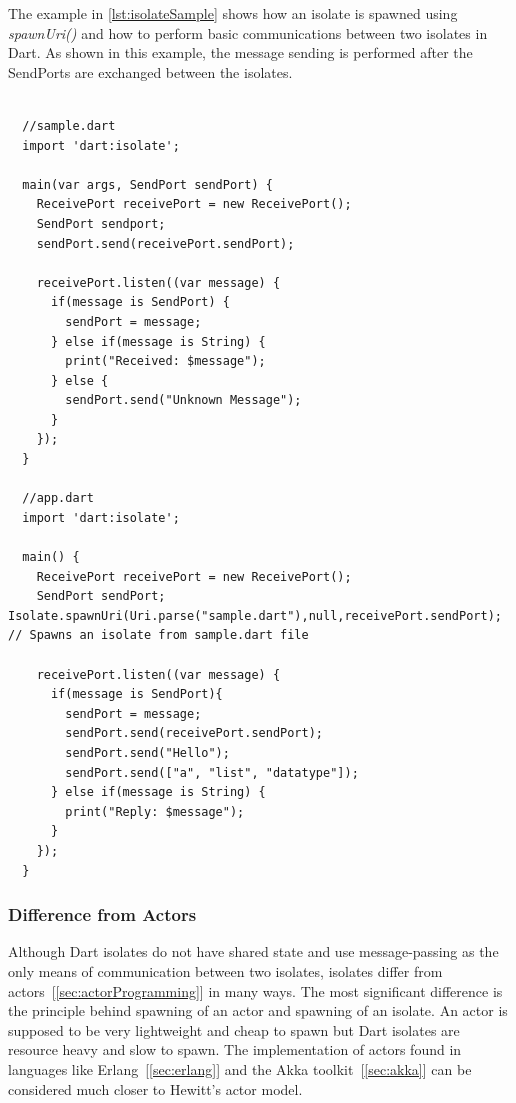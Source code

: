   The example in \autoref{lst:isolateSample} shows how an isolate is spawned using \emph{spawnUri()} and how to perform basic communications between two isolates in Dart. As shown in this example, the message sending is performed after the SendPorts are exchanged between the isolates.

\begin{lstlisting}[caption=A simple example of isolate communication in dart, label=lst:isolateSample]

  //sample.dart
  import 'dart:isolate';

  main(var args, SendPort sendPort) {
    ReceivePort receivePort = new ReceivePort();
    SendPort sendport;
    sendPort.send(receivePort.sendPort);

    receivePort.listen((var message) {
      if(message is SendPort) {
        sendPort = message;
      } else if(message is String) {
        print("Received: $message");
      } else {
        sendPort.send("Unknown Message");
      }
    });
  }

  //app.dart
  import 'dart:isolate';

  main() {
    ReceivePort receivePort = new ReceivePort();
    SendPort sendPort;  Isolate.spawnUri(Uri.parse("sample.dart"),null,receivePort.sendPort); // Spawns an isolate from sample.dart file

    receivePort.listen((var message) {
      if(message is SendPort){
        sendPort = message;
        sendPort.send(receivePort.sendPort);
        sendPort.send("Hello");
        sendPort.send(["a", "list", "datatype"]);
      } else if(message is String) {
        print("Reply: $message");
      }
    });
  }
\end{lstlisting}

  \subsubsection{Difference from Actors}
  Although Dart isolates do not have shared state and use message-passing as the only means of communication between two isolates, isolates differ from actors~[\autoref{sec:actorProgramming}] in many ways. The most significant difference is the principle behind spawning of an actor and spawning of an isolate. An actor is supposed to be very lightweight and cheap to spawn but Dart isolates are resource heavy and slow to spawn. The implementation of actors found in languages like Erlang~[\autoref{sec:erlang}] and the Akka toolkit~[\autoref{sec:akka}] can be considered much closer to Hewitt's actor model.

